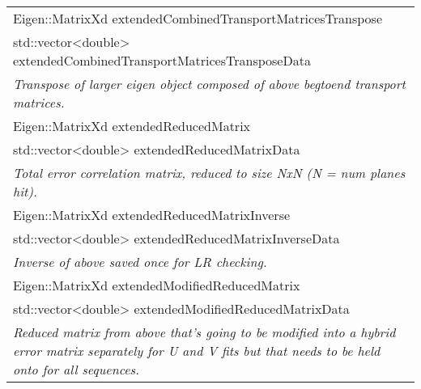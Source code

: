 \begin{longtable}{|p{16cm}|}
Eigen::MatrixXd extendedCombinedTransportMatricesTranspose \\
std::vector\textless{}double\textgreater{} extendedCombinedTransportMatricesTransposeData \\
\textit{Transpose of larger eigen object composed of above begtoend transport matrices.} \\ \hline

Eigen::MatrixXd extendedReducedMatrix \\
std::vector\textless{}double\textgreater{} extendedReducedMatrixData \\ 
\textit{Total error correlation matrix, reduced to size NxN (N = num planes hit).} \\ \hline

Eigen::MatrixXd extendedReducedMatrixInverse \\ 
std::vector\textless{}double\textgreater{} extendedReducedMatrixInverseData \\
\textit{Inverse of above saved once for LR checking.} \\ \hline

Eigen::MatrixXd extendedModifiedReducedMatrix \\ 
std::vector\textless{}double\textgreater{} extendedModifiedReducedMatrixData \\
\textit{Reduced matrix from above that's going to be modified into a hybrid error matrix separately for U and V fits but that needs to be held onto for all sequences.} \\ \hline


  \hline

\end{longtable}
